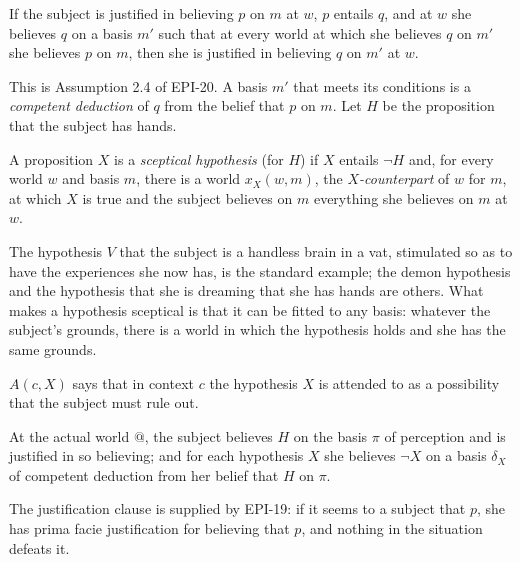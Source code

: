 \documentclass{situationist-preprint}
\begin{document}
\begin{assumption}\label{a:jclosure}
If the subject is justified in believing $p$ on $m$ at $w$, $p$ entails $q$, and at $w$ she believes $q$ on a basis $m'$ such that at every world at which she believes $q$ on $m'$ she believes $p$ on $m$, then she is justified in believing $q$ on $m'$ at $w$.
\end{assumption}

This is Assumption 2.4 of EPI-20. A basis $m'$ that meets its conditions is a \emph{competent deduction} of $q$ from the belief that $p$ on $m$. Let $H$ be the proposition that the subject has hands.

\begin{definition}\label{d:sceptical}
A proposition $X$ is a \emph{sceptical hypothesis} (for $H$) if $X$ entails $\neg H$ and, for every world $w$ and basis $m$, there is a world $x_{X}(w,m)$, the \emph{$X$-counterpart} of $w$ for $m$, at which $X$ is true and the subject believes on $m$ everything she believes on $m$ at $w$.
\end{definition}

The hypothesis $V$ that the subject is a handless brain in a vat, stimulated so as to have the experiences she now has, is the standard example; the demon hypothesis and the hypothesis that she is dreaming that she has hands are others. What makes a hypothesis sceptical is that it can be fitted to any basis: whatever the subject's grounds, there is a world in which the hypothesis holds and she has the same grounds.

\begin{definition}[Attention]\label{d:attention}
$A(c,X)$ says that in context $c$ the hypothesis $X$ is attended to as a possibility that the subject must rule out.
\end{definition}

\begin{assumption}\label{a:moore}
At the actual world $@$, the subject believes $H$ on the basis $\pi$ of perception and is justified in so believing; and for each hypothesis $X$ she believes $\neg X$ on a basis $\delta_X$ of competent deduction from her belief that $H$ on $\pi$.
\end{assumption}

The justification clause is supplied by EPI-19: if it seems to a subject that $p$, she has prima facie justification for believing that $p$, and nothing in the situation defeats it.
\end{document}
